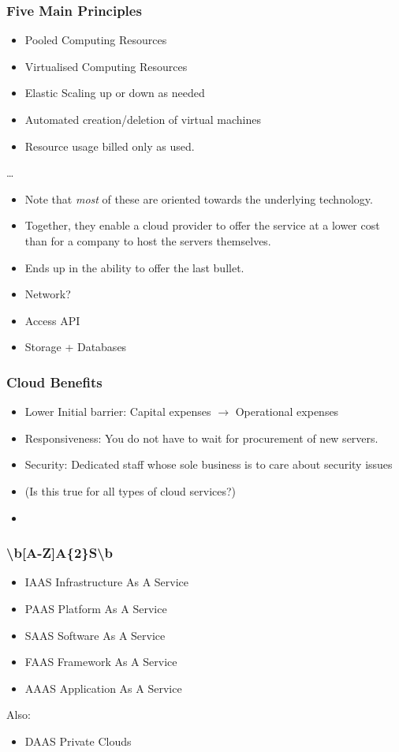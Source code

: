 \documentclass[10pt]{beamer}
\def\subitem{\item[\hspace{1.5cm} -]}
\begin{document}
\begin{frame}[t]
\frametitle{Five Main Principles}
\begin{itemize}
\item Pooled Computing Resources
\item Virtualised Computing Resources
\item Elastic Scaling up or down as needed
\item Automated creation/deletion of virtual machines
\item Resource usage billed only as used.
\end{itemize}

\ldots
\begin{itemize}
\item Note that \emph{most} of these are oriented towards the underlying technology.
\item Together, they enable a cloud provider to offer the service at a lower cost than for a company to host the servers themselves.
\item Ends up in the ability to offer the last bullet.
\item Network?
\item Access API
\item Storage + Databases
\end{itemize}
\end{frame}


\begin{frame}[t]
\frametitle{Cloud Benefits}

\begin{itemize}
\item Lower Initial barrier: Capital expenses $\rightarrow$ Operational expenses
\item Responsiveness: You do not have to wait for procurement of new servers.
\item Security: Dedicated staff whose sole business is to care about security issues
\subitem (Is this true for all types of cloud services?)
\item 
\end{itemize}
\end{frame}


\begin{frame}[t]
\frametitle{{\textbackslash}b[A-Z]A\{2\}S{\textbackslash}b}
\begin{itemize}
\item IAAS Infrastructure As A Service
\item PAAS Platform As A Service
\item SAAS Software As A Service
\item FAAS Framework As A Service
\item AAAS Application As A Service
\end{itemize}

Also:
\begin{itemize}
\item DAAS Private Clouds
\end{itemize}
\end{frame}
\end{document}
